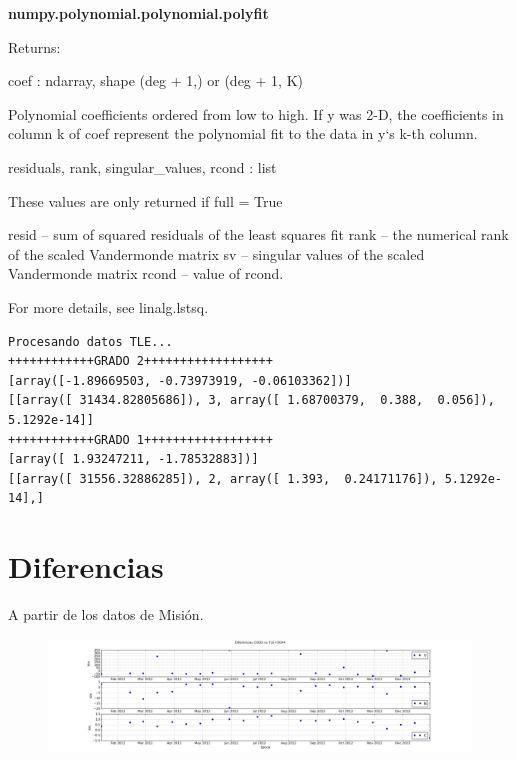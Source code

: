 {\bf{numpy.polynomial.polynomial.polyfit}}

Returns:	

coef : ndarray, shape (deg + 1,) or (deg + 1, K)

    Polynomial coefficients ordered from low to high. If y was 2-D, the coefficients in column k of coef represent the polynomial fit to the data in y‘s k-th column.

residuals, rank, singular\_values, rcond : list

    These values are only returned if full = True

    resid – sum of squared residuals of the least squares fit rank – the numerical rank of the scaled Vandermonde matrix sv – singular values of the scaled Vandermonde matrix rcond – value of rcond.

    For more details, see linalg.lstsq.

\begin{verbatim}
Procesando datos TLE...
++++++++++++GRADO 2++++++++++++++++++
[array([-1.89669503, -0.73973919, -0.06103362])]
[[array([ 31434.82805686]), 3, array([ 1.68700379,  0.388,  0.056]), 5.1292e-14]]
++++++++++++GRADO 1++++++++++++++++++
[array([ 1.93247211, -1.78532883])]
[[array([ 31556.32886285]), 2, array([ 1.393,  0.24171176]), 5.1292e-14],]
\end{verbatim}

% 


\section*{Diferencias}
A partir de los datos de Misión. 

\begin{figure}[!h]
  \centering
  \includegraphics[width=\textwidth]{imagenes/sesgoTLE}
\end{figure}

